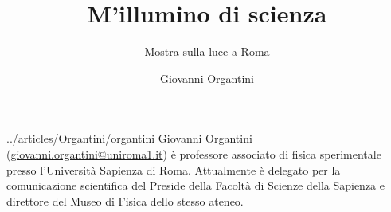 ﻿\title{M'illumino di scienza}
\subtitle{Mostra sulla luce a Roma}
\suptitle{\phantom{x}}
\author{Giovanni Organtini}
\maketitle
\begin{small}
\pichskip{4mm}
\nobalance



\vfill
\begin{thebiography}{../articles/Organtini/organtini}
Giovanni Organtini (\url{giovanni.organtini@uniroma1.it}) è professore associato di fisica sperimentale presso l'Università Sapienza di Roma.
Attualmente è delegato per la comunicazione scientifica del Preside della Facoltà di Scienze della Sapienza e direttore del Museo di Fisica
dello stesso ateneo.
\end{thebiography}
\end{small}


